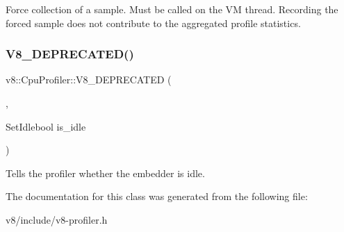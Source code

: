 Force collection of a sample. Must be called on the VM thread. Recording the forced sample does not contribute to the aggregated profile statistics. \mbox{\label{classv8_1_1CpuProfiler_aa5a41d80d7d262f2c171a4382f2fbd4f}} 
\subsubsection{\texorpdfstring{V8\+\_\+\+D\+E\+P\+R\+E\+C\+A\+T\+E\+D()}{V8\_DEPRECATED()}\hspace{0.1cm}{\footnotesize\ttfamily [2/2]}}
{\footnotesize\ttfamily v8\+::\+Cpu\+Profiler\+::\+V8\+\_\+\+D\+E\+P\+R\+E\+C\+A\+T\+ED (\begin{DoxyParamCaption}\item[{\char`\"{}Use Isolate\+::\+Set\+Idle(bool) instead.\char`\"{}}]{,  }\item[{void }]{Set\+Idlebool is\+\_\+idle }\end{DoxyParamCaption})}

Tells the profiler whether the embedder is idle. 

The documentation for this class was generated from the following file\+:\begin{DoxyCompactItemize}
\item 
v8/include/v8-\/profiler.\+h\end{DoxyCompactItemize}
